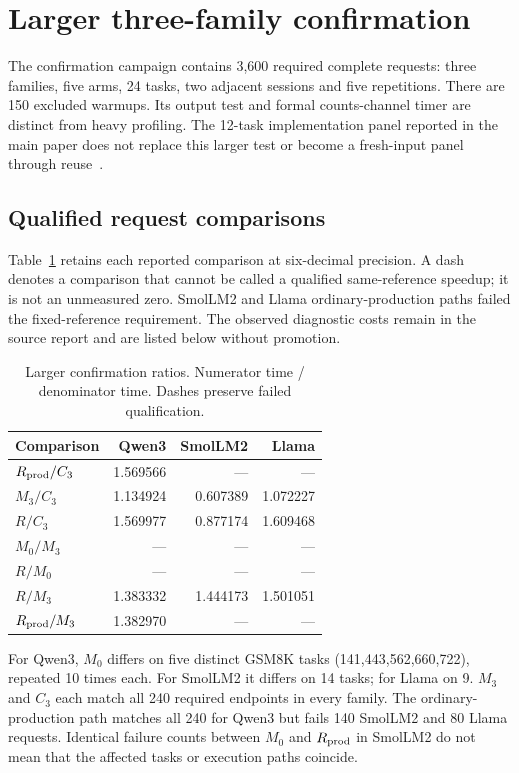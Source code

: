 \section{Larger three-family confirmation}
\label{supp:confirmation}
The confirmation campaign contains 3,600 required complete requests: three families, five arms, 24 tasks, two adjacent sessions and five repetitions. There are 150 excluded warmups. Its output test and formal counts-channel timer are distinct from heavy profiling. The 12-task implementation panel reported in the main paper does not replace this larger test or become a fresh-input panel through reuse~\cite{rtxconfirm}.

\subsection{Qualified request comparisons}
Table~\ref{tab:confirmationratios} retains each reported comparison at six-decimal precision. A dash denotes a comparison that cannot be called a qualified same-reference speedup; it is not an unmeasured zero. SmolLM2 and Llama ordinary-production paths failed the fixed-reference requirement. The observed diagnostic costs remain in the source report and are listed below without promotion.

\begin{table}[t]\centering\small
\caption{Larger confirmation ratios. Numerator time / denominator time. Dashes preserve failed qualification.}
\label{tab:confirmationratios}
\begin{tabular}{@{}lrrr@{}}\toprule
Comparison&Qwen3&SmolLM2&Llama\\\midrule
$R_{\rm prod}/C_3$&1.569566&---&---\\
$M_3/C_3$&1.134924&0.607389&1.072227\\
$R/C_3$&1.569977&0.877174&1.609468\\
$M_0/M_3$&---&---&---\\
$R/M_0$&---&---&---\\
$R/M_3$&1.383332&1.444173&1.501051\\
$R_{\rm prod}/M_3$&1.382970&---&---\\\bottomrule
\end{tabular}
\end{table}

For Qwen3, $M_0$ differs on five distinct GSM8K tasks (141,443,562,660,722), repeated 10 times each. For SmolLM2 it differs on 14 tasks; for Llama on 9. $M_3$ and $C_3$ each match all 240 required endpoints in every family. The ordinary-production path matches all 240 for Qwen3 but fails 140 SmolLM2 and 80 Llama requests. Identical failure counts between $M_0$ and $R_{\rm prod}$ in SmolLM2 do not mean that the affected tasks or execution paths coincide.

